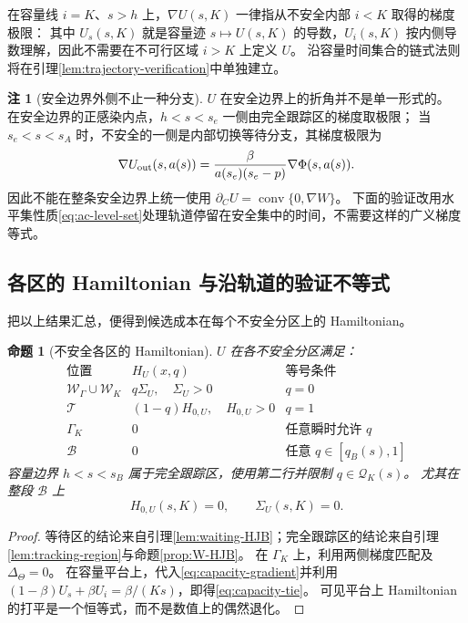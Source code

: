 \documentclass[11pt,a4paper,UTF8]{ctexart}
\newtheorem{proposition}[theorem]{命题}
\theoremstyle{definition}
\newtheorem{remark}[theorem]{注}
\begin{document}
在容量线 $i=K$、$s>h$ 上，$\nabla U(s,K)$ 一律指从不安全内部 $i<K$ 取得的梯度极限：
其中 $U_s(s,K)$ 就是容量迹 $s\mapsto U(s,K)$ 的导数，$U_i(s,K)$ 按内侧导数理解，因此不需要在不可行区域 $i>K$ 上定义 $U$。
沿容量时间集合的链式法则将在引理\ref{lem:trajectory-verification}中单独建立。

\begin{remark}[安全边界外侧不止一种分支]
\label{rem:safe-gradient}
$U$ 在安全边界上的折角并不是单一形式的。
在安全边界的正感染内点，$h<s<s_e$ 一侧由完全跟踪区的梯度取极限；
当 $s_e<s<s_A$ 时，不安全的一侧是内部切换等待分支，其梯度极限为
\[
\nabla U_{\rm out}(s,a(s))=
\frac{\beta}{a(s_e)(s_e-p)}\nabla\Phi(s,a(s)).
\]
因此不能在整条安全边界上统一使用 $\partial_C U=\operatorname{conv}\{0,\nabla W\}$。
下面的验证改用水平集性质\eqref{eq:ac-level-set}处理轨道停留在安全集中的时间，不需要这样的广义梯度等式。
\end{remark}

\subsection{各区的 Hamiltonian 与沿轨道的验证不等式}
把以上结果汇总，便得到候选成本在每个不安全分区上的 Hamiltonian。

\begin{proposition}[不安全各区的 Hamiltonian]
\label{prop:all-HJB}
$U$ 在各不安全分区满足：
\begin{equation}
\begin{array}{c|c|c}
\text{位置}&H_U(x,q)&\text{等号条件}\\\hline
\mathcal W_\Gamma\cup\mathcal W_K&q\Sigma_U,\quad\Sigma_U>0&q=0\\
\mathcal T&(1-q)H_{0,U},\quad H_{0,U}>0&q=1\\
\Gamma_K&0&\text{任意瞬时允许 }q\\
\mathcal B&0&\text{任意 }q\in[q_B(s),1]
\end{array}
\label{eq:HJB-table}
\end{equation}
容量边界 $h<s<s_B$ 属于完全跟踪区，使用第二行并限制 $q\in \mathcal Q_K(s)$。
尤其在整段 $\mathcal B$ 上
\begin{equation}
\boxed{H_{0,U}(s,K)=0,\qquad\Sigma_U(s,K)=0.}
\label{eq:capacity-tie}
\end{equation}
\end{proposition}
\begin{proof}
等待区的结论来自引理\ref{lem:waiting-HJB}；完全跟踪区的结论来自引理\ref{lem:tracking-region}与命题\ref{prop:W-HJB}。
在 $\Gamma_K$ 上，利用两侧梯度匹配及 $\Delta_\Theta=0$。
在容量平台上，代入\eqref{eq:capacity-gradient}并利用 $(1-\beta)U_s+\beta U_i=\beta/(Ks)$，即得\eqref{eq:capacity-tie}。
可见平台上 Hamiltonian 的打平是一个恒等式，而不是数值上的偶然退化。
\end{proof}
\end{document}
